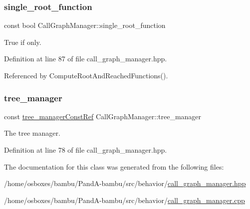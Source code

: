 \subsubsection{\texorpdfstring{single\+\_\+root\+\_\+function}{single\_root\_function}}
{\footnotesize\ttfamily const bool Call\+Graph\+Manager\+::single\+\_\+root\+\_\+function\hspace{0.3cm}{\ttfamily [private]}}



True if only. 



Definition at line 87 of file call\+\_\+graph\+\_\+manager.\+hpp.



Referenced by Compute\+Root\+And\+Reached\+Functions().

\mbox{\label{classCallGraphManager_a9018abdd8aee3716e816c2854860dc1b}} 
\subsubsection{\texorpdfstring{tree\+\_\+manager}{tree\_manager}}
{\footnotesize\ttfamily const \hyperlink{tree__manager_8hpp_a792e3f1f892d7d997a8d8a4a12e39346}{tree\+\_\+manager\+Const\+Ref} Call\+Graph\+Manager\+::tree\+\_\+manager\hspace{0.3cm}{\ttfamily [private]}}



The tree manager. 



Definition at line 78 of file call\+\_\+graph\+\_\+manager.\+hpp.



The documentation for this class was generated from the following files\+:\begin{DoxyCompactItemize}
\item 
/home/osboxes/bambu/\+Pand\+A-\/bambu/src/behavior/\hyperlink{call__graph__manager_8hpp}{call\+\_\+graph\+\_\+manager.\+hpp}\item 
/home/osboxes/bambu/\+Pand\+A-\/bambu/src/behavior/\hyperlink{call__graph__manager_8cpp}{call\+\_\+graph\+\_\+manager.\+cpp}\end{DoxyCompactItemize}
